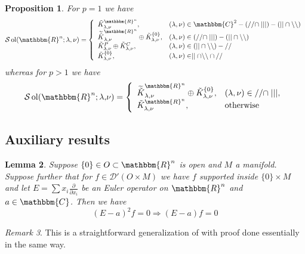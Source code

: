 \documentclass{article}
\newcommand{\comma}{{,}}
\newcommand{\tmop}[1]{\ensuremath{\operatorname{#1}}}
\newtheorem{proposition}{Proposition}[section]
\newtheorem{lemma}[proposition]{Lemma}
\theoremstyle{remark}
\newtheorem{remark}[proposition]{Remark}
\begin{document}
\begin{proposition}
  \label{sol-MO:prop-main}For $p = 1$ we have
  \[ \mathcal{S} \tmop{ol} (\mathbbm{R}^n ; \lambda, \nu) = \left\{
     \begin{array}{ll}
       \tilde{K}_{\lambda, \nu}^{\mathbbm{R}^n}, & (\lambda, \nu) \in
       \mathbbm{C}^2 - (/ / \cap \mid \mid \mid) - (| | \cap
       \backslash\backslash)\\
       \widetilde{\tilde{K}}_{\lambda, \nu}^{\mathbbm{R}^n} \oplus
       \tilde{K}^{\{ 0 \}}_{\lambda, \nu}, & (\lambda, \nu) \in (/ / \cap \mid
       \mid \mid) - (| | \cap \backslash\backslash)\\
       \tilde{K}_{\lambda, \nu}^P \oplus \tilde{K}_{\lambda, \nu}^C, &
       (\lambda, \nu) \in (| | \cap \backslash\backslash) - / /\\
       \tilde{K}^{\{ 0 \}}_{\lambda, \nu}, & (\lambda, \nu) \in \mid
       \mid \cap \backslash\backslash \cap / /
     \end{array} \right. \]
  whereas for $p > 1$ we have
  \[ \mathcal{S} \tmop{ol} (\mathbbm{R}^n ; \lambda \comma \nu) = \left\{
     \begin{array}{ll}
       \widetilde{\tilde{K}}_{\lambda, \nu}^{\mathbbm{R}^n} \oplus
       \tilde{K}^{\{ 0 \}}_{\lambda, \nu}, & (\lambda, \nu) \in / / \cap \mid
       \mid \mid,\\
       \tilde{K}^{\mathbbm{R}^n}_{\lambda, \nu}, & \tmop{otherwise}
     \end{array} \right. \]
\end{proposition}

\subsection{Auxiliary results}

\begin{lemma}
  \label{sol-MO:lem-E2}Suppose $\{ 0 \} \in O \subset \mathbbm{R}^n$ is open
  and $M$ a manifold. Suppose further that for $f \in \mathcal{D}' (O \times
  M)$ we have $f$ supported inside $\{ 0 \} \times M$ and let $E = \sum x_i
  \frac{\partial}{\partial x_i}$ be an Euler operator on $\mathbbm{R}^n$ and
  $a \in \mathbbm{C}$. Then we have
  \[ (E - a)^2 f = 0 \Rightarrow (E - a) f = 0 \]
\end{lemma}

\begin{remark}
  This is a straightforward generalization of {\cite[lem.
  11.11]{kobayashi2015symmetry}} with proof done essentially in the same way.
\end{remark}
\end{document}

